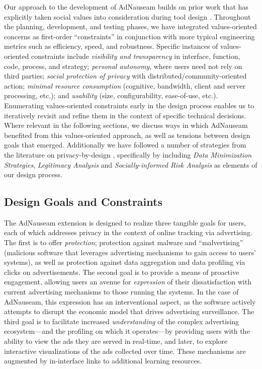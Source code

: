 \documentclass[conference]{IEEEtran}
\begin{document}
Our approach to the development of AdNauseam builds on prior work that has explicitly taken social values into consideration during tool design \cite{Friedman,Flanagan,Howe-1}. Throughout the planning, development, and testing phases, we have integrated values-oriented concerns as first-order ``constraints'' in conjunction with more typical engineering metrics such as efficiency, speed, and robustness. Specific instances of values-oriented constraints include \emph{visibility and transparency} in interface, function, code, process, and strategy; \emph{personal autonomy}, where users need not rely on third parties; \emph{social protection of privacy} with distributed/community-oriented action; \emph{minimal resource consumption} (cognitive, bandwidth, client and server processing, etc.); and \emph{usability} (size, configurability, ease-of-use, etc.). Enumerating values-oriented constraints early in the design process enables us to iteratively revisit and refine them in the context of specific technical decisions. Where relevant in the following sections, we discuss ways in which AdNauseam benefited from this values-oriented approach, as well as tensions between design goals that emerged. Additionally we have followed a number of strategies from the literature on privacy-by-design \cite{Gurses-0, Hoepman, Gurses-1}, specifically by including \emph{Data Minimization Strategies}, \emph{Legitimacy Analysis} and \emph{Socially-informed Risk Analysis} as elements of our design process.

\subsection{Design Goals and Constraints}

The AdNauseam extension is designed to realize three tangible goals for users, each of which addresses privacy in the context of online tracking via advertising. The first is to offer \emph{protection}; protection against malware and ``malvertising'' (malicious software that leverages advertising mechanisms to gain access to users' systems\cite{Mansfield}), as well as protection against data aggregation and data profiling via clicks on advertisements. The second goal is to provide a means of proactive engagement, allowing users an avenue for \emph{expression} of their dissatisfaction with current advertising mechanisms to those running the systems. In the case of AdNauseam, this expression has an interventional aspect, as the software actively attempts to disrupt the economic model that drives advertising surveillance. The third goal is to facilitate increased \emph{understanding} of the complex advertising ecosystem---and the profiling on which it operates---by providing users with the ability to view the ads they are served in real-time, and later, to explore interactive visualizations of the ads collected over time. These mechanisms are augmented by in-interface links to additional learning resources.
\end{document}
